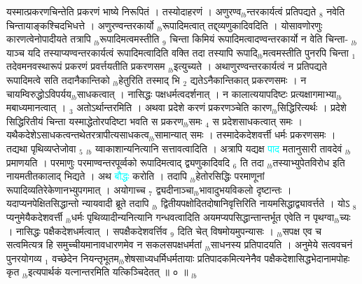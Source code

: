 \documentclass[article,12pt,a4paper]{memoir}%
\newcommand{\quotelemma}[1]{\textcolor{cyan}{#1}}
\newcounter{parCount}
\begin{document}
	  
	  \pstart \leavevmode%
	यस्मात्प्रकरणचिन्तेति प्रकरणं भाष्ये निरूपितं । तस्योदाहरणं । अणुरण्व{\tiny $_{lb}$}न्तरकार्यत्वं प्रतिपद्यते {\tiny $_{8}$} नवेति चिन्तायाङ्कश्चिदभिधत्ते । अणुरण्वन्तरकार्यो {\tiny $_{lb}$}रूपादिमत्वात् तद्द्व्यणुकादिवदिति । योसावणोरणुः कारणत्वेनोपादीयते तत्रापि {\tiny $_{lb}$}रूपादिमत्वमस्तीति {\tiny $_{9}$} \leavevmode{} चिन्ता किमियं रूपादिमत्वादण्वन्तरकार्यो न वेति चिन्ता- {\tiny $_{lb}$}याञ्च यदि तस्याप्यण्वन्तरकार्यत्वं रूपादिमत्वादिति वक्ति तदा तस्यापि रूपादि{\tiny $_{lb}$}मत्वमस्तीति पुनरपि चिन्ता {\tiny $_{1}$} तदेवमनवस्थारूपं प्रकरणं प्रवर्त्तयतीति प्रकरणसम {\tiny $_{lb}$}इत्युच्यते । अथाणुरण्वन्तरकार्यत्वं न प्रतिपद्यते रूपादिमत्वे सति तदानैकान्तिको {\tiny $_{lb}$}हेतुरिति तस्माद् भि {\tiny $_{2}$} द्यतेऽनैकान्तिकात् प्रकरणसमः । न चायम्विरुद्धोऽविपर्यय{\tiny $_{lb}$}साधकत्वात् । नासिद्धः पक्षधर्मत्वदर्शनात् । न कालात्ययापदिष्टः प्रत्यक्षागमाभ्या{\tiny $_{lb}$}मबाध्यमानत्वात् । {\tiny $_{3}$} अतोऽर्थान्तरमिति । अथवा प्रदेशे करणं प्रकरणञ्चेति कारण{\tiny $_{lb}$}सिद्धिरित्यर्थः । प्रदेशे सिद्धिरितीयं चिन्ता यस्माद्धेतोरपदिष्टा भवति स प्रकरण{\tiny $_{lb}$}समः {\tiny $_{4}$} स प्रदेशसाधकत्वात् समः । यथैकदेशेऽसाधकत्वन्तथेतरत्रापीत्यसाधकत्व{\tiny $_{lb}$}सामान्यात् समः । तस्मादेकदेशवर्त्ती धर्मः प्रकरणसमः । तद्यथा पृथिव्यप्तेजोवा {\tiny $_{5}$} {\tiny $_{lb}$} य्वाकाशान्यनित्यानि सत्तावत्वादिति । अत्रापि यद्यक्ष \quotelemma{पाद} मतानुसारी तावदेवं {\tiny $_{lb}$}प्रमाणयति । परमाणुः परमाण्वन्तरपूर्व्वको रूपादिमत्वाद् द्व्यणुकादिवदि {\tiny $_{6}$} ति तदा {\tiny $_{lb}$}तस्याभ्युपेतविरोध इति नायमतीतकालाद् भिद्यते । अथ \quotelemma{बौद्धः} करोति । तदापि {\tiny $_{lb}$}हेतोरसिद्धिः परमाणूनां रूपादिव्यतिरेकेणानभ्युपगमात् । अयोगाच्च {\tiny $_{7}$} द्व्यदीनाञ्चा{\tiny $_{lb}$}भावादुभयविकलो दृष्टान्तः । यदाप्यनपेक्षितसिद्धान्तो न्यायवादी ब्रूते तदापि {\tiny $_{lb}$} \leavevmode{} द्वितीयपक्षोदितदोषानिवृत्तिरिति नायमसिद्धाद्व्यावर्त्तते । योऽ {\tiny $_{8}$} प्यनुमेयैकदेशवर्त्ती {\tiny $_{lb}$}धर्मः पृथिव्यादीन्यनित्यानि गन्धवत्वादिति अयमप्यपसिद्धान्तान्तर्भूत एवेति न पृथग्वा{\tiny $_{lb}$}च्यः । नासिद्धः पक्षैकदेशधर्मत्वात् । सपक्षैकदेशवर्त्तिव {\tiny $_{9}$} \leavevmode{} दिति चेत् विषमोयमुपन्यासः । {\tiny $_{lb}$}सपक्ष एव च सत्वमित्यत्र हि समुच्चीयमानावधारणमेव न सकलसपक्षधर्मतां {\tiny $_{lb}$}साधनस्य प्रतिपादयति । अनुमेये सत्ववचनं पुनरयोगव्य {\tiny $_{1}$} वच्छेदेन नियन्तृभूतम{\tiny $_{lb}$}शेषसाध्यधर्मिधर्मतायाः प्रतिपादकमित्यनेनैव पक्षैकदेशासिद्धभेदानामपोहः कृत {\tiny $_{lb}$}इत्यपार्थकं यत्नान्तरमिति यत्किञ्चिदेतत् ॥ ० ॥
	{}
	\pend%
      {\tiny $_{lb}$}
\end{document}
